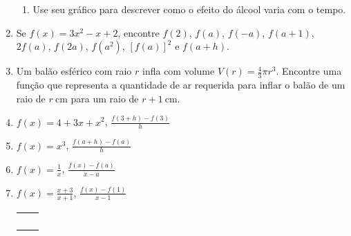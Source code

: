 \begin{enumerate}[label=\textbf{\arabic*.},leftmargin=*]
\begin{enumerate}
    \item Use seu gráfico para descrever como o efeito do álcool varia com o tempo.
  \end{enumerate}
  \item Se $f(x)=3x^2-x+2$, encontre $f(2)$, $f(a)$, $f(-a)$, $f(a+1)$, $2f(a)$, $f(2a)$, $f(a^2)$, $[f(a)]^2$ e $f(a+h)$.
  \item Um balão esférico com raio $r$ infla com volume $V(r)=\frac{4}{3}\pi r^3$. Encontre uma função que representa a quantidade de ar requerida para inflar o balão de um raio de $r~\si{\centi\meter}$ para um raio de $r+1~\si{\centi\meter}$.
  
  \item[\difficultQuestion] $\displaystyle f(x)=4+3x+x^2$, $\displaystyle \frac{f(3+h)-f(3)}{h}$
  \item $\displaystyle f(x)=x^3$, $\displaystyle \frac{f(a+h)-f(a)}{h}$
  \item $\displaystyle f(x)=\frac{1}{x}$, $\displaystyle \frac{f(x)-f(a)}{x-a}$
  \item $\displaystyle f(x)=\frac{x+3}{x+1}$, $\displaystyle \frac{f(x)-f(1)}{x-1}$
  \NoIndent{\hspace{-0.2cm}\rule{1.02\columnwidth}{0.5pt}}
  \clearpage{}
  \begin{tabular}{@{}m{}m{}@{}}
    \item $\displaystyle f(x)=\frac{x+4}{x^2-9}$ &
    \item $\displaystyle f(x)=\frac{2x^3-5}{x^2+x-6}$ \\\vspace{0.2cm}
    \item $\displaystyle f(x)=\sqrt[3]{2t-1}$ &
    \item $\displaystyle f(x)=\sqrt{3-t}-\sqrt{2+t}$\\
    \item $\displaystyle h(x)=\frac{1}{\sqrt[4]{x^2-5x}}$ &
    \item $\displaystyle f(u)=\frac{u+1}{1+\frac{1}{u+1}}$\\\vspace{0.2cm}
    \item $\displaystyle F(p)=\sqrt{2-\sqrt{p}}$
  \end{tabular}
  \NoIndent{\hspace{-0.2cm}\rule{1.02\columnwidth}{0.5pt}}

\end{enumerate}
